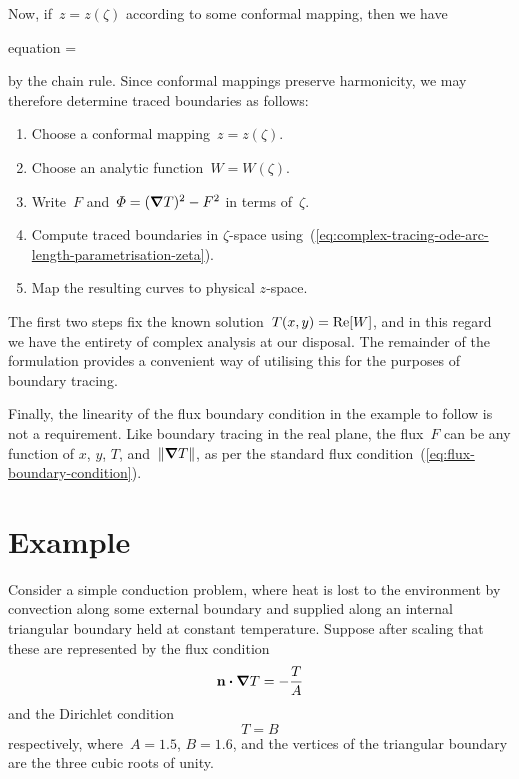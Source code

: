 Now, if~$z = z (\zeta)$ according to some conformal mapping,
then we have
\begin{important}{equation}
   = 
  \label{eq:complex-tracing-ode-arc-length-parametrisation-zeta}
\end{important}
by the chain rule.
Since conformal mappings preserve harmonicity,
we may therefore determine traced boundaries as follows:
\begin{enumerate}
  \tightlist
  \item
    Choose a conformal mapping~$z = z (\zeta)$.
  \item
    Choose an analytic function~$W = W (\zeta)$.
  \item
    Write~$F$ and~$\varPhi = (\mathop{}\!\boldsymbol{\mathbf{\nabla}} T)^2 - F^2$ in terms of~$\zeta$.
  \item
    Compute traced boundaries in $\zeta$-space
    using~(\ref{eq:complex-tracing-ode-arc-length-parametrisation-zeta}).
  \item
    Map the resulting curves to physical $z$-space.
\end{enumerate}
The first two steps fix the known solution~$T (x, y) = \mathop{}\!\mathrm{Re} [W]$,
and in this regard
we have the entirety of complex analysis at our disposal.
The remainder of the formulation provides
a convenient way of utilising this for the purposes of boundary tracing.

Finally, the linearity of the flux boundary condition
in the example to follow
is not a requirement.
Like boundary tracing in the real plane,
the flux~$F$ can be any function of $x$, $y$, $T$, and~$\lVert\mathop{}\!\boldsymbol{\mathbf{\nabla}} T\rVert$,
as per the standard flux condition~(\ref{eq:flux-boundary-condition}).

\section{Example}
\label{sec:complex.example}

Consider a simple conduction problem,
where heat is lost to the environment
by convection along some external boundary
and supplied along an internal triangular boundary
held at constant temperature.
Suppose after scaling that these are represented
by the flux condition
\begin{equation}
  \mathop{}\!\boldsymbol{\mathbf{n}} \boldsymbol{\cdot} \mathop{}\!\boldsymbol{\mathbf{\nabla}} T = -\frac{T}{A}
  \label{eq:example-flux-boundary-condition}
\end{equation}
and the Dirichlet condition
\begin{equation}
  T = B
  \label{eq:example-dirichlet-condition}
\end{equation}
respectively,
where~$A = 1.5$, $B = 1.6$,
and the vertices of the triangular boundary
are the three cubic roots of unity.

